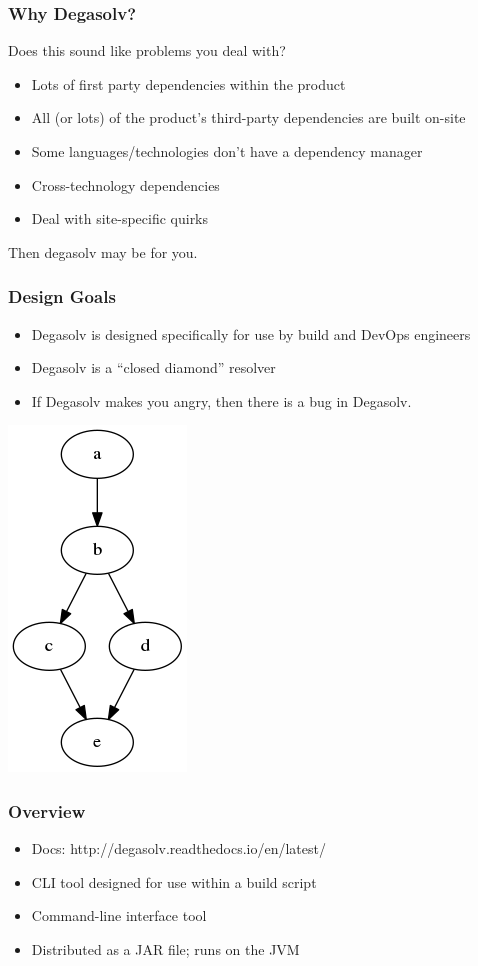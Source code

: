 \documentclass{beamer}
\begin{document}
\begin{frame}
  \frametitle{Why Degasolv?}

  Does this sound like problems you deal with?

  \break

  \begin{itemize}
  \item Lots of first party dependencies within the product
  \item All (or lots) of the product's third-party dependencies are built
      on-site
  \item Some languages/technologies don't have a dependency manager
  \item Cross-technology dependencies
  \item Deal with site-specific quirks
  \end{itemize}

  \break

  Then degasolv may be for you.

\end{frame}
\begin{frame}
  \frametitle{Design Goals}
  \begin{itemize}
  \item Degasolv is designed specifically for use by build and DevOps engineers
  \item Degasolv is a ``closed diamond'' resolver
  \item If Degasolv makes you angry, then there is a bug in Degasolv.
  \end{itemize}
  \centerline{\includegraphics[scale=0.5]{diamonddep.png}}
\end{frame}
\begin{frame}
  \frametitle{Overview}
  \begin{itemize}
  \item Docs: {\small http://degasolv.readthedocs.io/en/latest/}
  \item CLI tool designed for use within a build script
  \item Command-line interface tool
  \item Distributed as a JAR file; runs on the JVM
  \end{itemize}
\end{frame}
\end{document}
